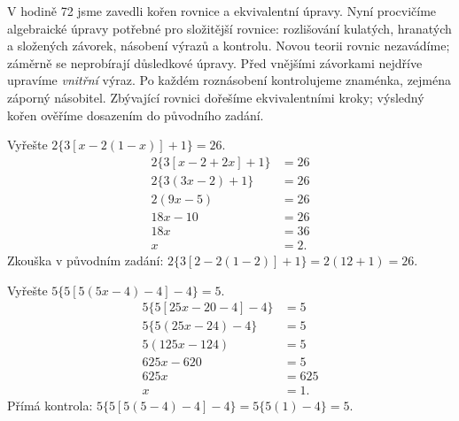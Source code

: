 \documentclass[11pt,a4paper]{article}
\begin{document}
V hodině 72 jsme zavedli kořen rovnice a ekvivalentní úpravy. Nyní procvičíme algebraické úpravy potřebné pro složitější rovnice: rozlišování kulatých, hranatých a složených závorek, násobení výrazů a kontrolu. Novou teorii rovnic nezavádíme; záměrně se neprobírají důsledkové úpravy.
Před vnějšími závorkami nejdříve upravíme \emph{vnitřní} výraz. Po každém roznásobení kontrolujeme znaménka, zejména záporný násobitel. Zbývající rovnici dořešíme ekvivalentními kroky; výsledný kořen ověříme dosazením do původního zadání.
\begin{prikladReseniBox}[title={Příklad 1 – závorky ve třech úrovních}]
Vyřešte $2\{3[x-2(1-x)]+1\}=26$.
\tcblower
\begin{align*}
2\{3[x-2+2x]+1\}&=26\\
2\{3(3x-2)+1\}&=26\\
2(9x-5)&=26\\
18x-10&=26\\
18x&=36\\
x&=2.
\end{align*}
Zkouška v původním zadání: $2\{3[2-2(1-2)]+1\}=2(12+1)=26$.
\end{prikladReseniBox}
\begin{prikladReseniBox}[title={Příklad 2 – úloha podle fotografie (č. 1a)}]
Vyřešte $5\{5[5(5x-4)-4]-4\}=5$.
\tcblower
\begin{align*}
5\{5[25x-20-4]-4\}&=5\\
5\{5(25x-24)-4\}&=5\\
5(125x-124)&=5\\
625x-620&=5\\
625x&=625\\
x&=1.
\end{align*}
Přímá kontrola: $5\{5[5(5-4)-4]-4\}=5\{5(1)-4\}=5$.
\end{prikladReseniBox}
\end{document}
